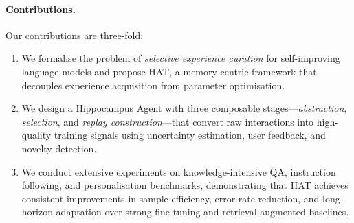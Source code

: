 \paragraph{Contributions.}
Our contributions are three-fold:
\begin{enumerate}[leftmargin=*,itemsep=2pt,topsep=3pt]
  \item We formalise the problem of \emph{selective experience curation} for self-improving language models and propose HAT, a memory-centric framework that decouples experience acquisition from parameter optimisation.
  \item We design a Hippocampus Agent with three composable stages---\emph{abstraction}, \emph{selection}, and \emph{replay construction}---that convert raw interactions into high-quality training signals using uncertainty estimation, user feedback, and novelty detection.
  \item We conduct extensive experiments on knowledge-intensive QA, instruction following, and personalisation benchmarks, demonstrating that HAT achieves consistent improvements in sample efficiency, error-rate reduction, and long-horizon adaptation over strong fine-tuning and retrieval-augmented baselines.
\end{enumerate}
